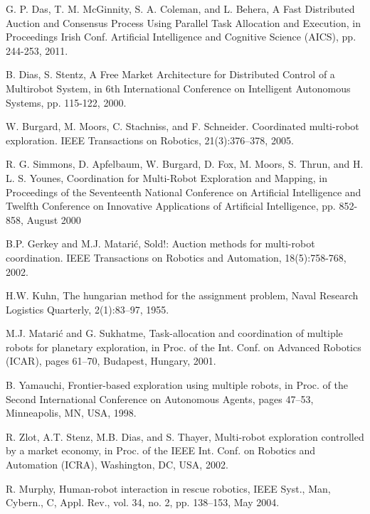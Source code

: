 \documentclass[letterpaper, 10 pt, conference]{ieeeconf}  %
\begin{document}



\begin{thebibliography}{99}

 G. P. Das, T. M. McGinnity, S. A. Coleman, and L. Behera, A Fast Distributed Auction and Consensus Process Using Parallel Task Allocation and Execution, in Proceedings Irish Conf. Artificial Intelligence and Cognitive Science (AICS), pp. 244-253, 2011.

 B. Dias, S. Stentz, A Free Market Architecture for Distributed Control of a Multirobot System, in 6th International Conference on Intelligent Autonomous Systems, pp. 115-122, 2000.

 W. Burgard, M. Moors, C. Stachniss, and F. Schneider. Coordinated multi-robot exploration. IEEE Transactions on Robotics, 21(3):376–378, 2005.

 R. G. Simmons, D. Apfelbaum, W. Burgard, D. Fox, M. Moors, S. Thrun, and H. L. S. Younes, Coordination for Multi-Robot Exploration and Mapping, in Proceedings of the Seventeenth National Conference on Artificial Intelligence and Twelfth Conference on Innovative Applications of Artificial Intelligence, pp. 852-858, August 2000 

 B.P. Gerkey and M.J. Matarić, Sold!: Auction methods for multi-robot coordination. IEEE Transactions on Robotics and Automation,
18(5):758-768, 2002.

 H.W. Kuhn, The hungarian method for the assignment problem, Naval Research Logistics Quarterly, 2(1):83–97, 1955.

 M.J. Matarić and G. Sukhatme, Task-allocation and coordination of
multiple robots for planetary exploration, in Proc. of the Int. Conf. on Advanced Robotics (ICAR), pages 61–70, Budapest, Hungary, 2001.

 B. Yamauchi, Frontier-based exploration using multiple robots, in
Proc. of the Second International Conference on Autonomous Agents, pages 47–53, Minneapolis, MN, USA, 1998.

 R. Zlot, A.T. Stenz, M.B. Dias, and S. Thayer, Multi-robot exploration controlled by a market economy, in Proc. of the IEEE Int. Conf. on Robotics and Automation (ICRA), Washington, DC, USA, 2002.

 R. Murphy, Human-robot interaction in rescue robotics, IEEE Syst., Man, Cybern., C, Appl. Rev., vol. 34, no. 2, pp. 138–153, May 2004.


\end{thebibliography}
\end{document}
